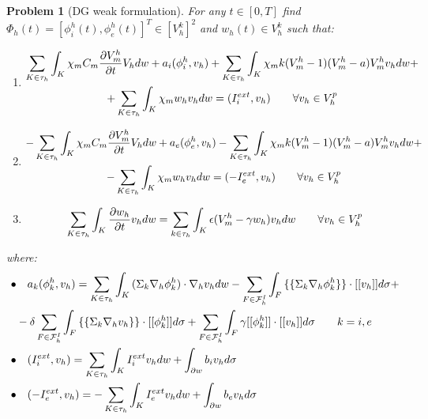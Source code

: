 \documentclass[a4paper,11pt]{article}
\newtheorem{problem}{Problem}
\begin{document}
    \begin{problem}[DG weak formulation]
    For any $t\in[0,T]$ find $\Phi_h(t)=[\phi_i^h(t),\phi_e^h(t)]^T \in [V_h^k]^2$  and  $w_h(t) \in V_h^k$ such that: \\
    \begin{enumerate}
    \item 
    \begin{equation*}
    \begin{gathered}
    \sum_{K \in \tau_h} \int_K{ \chi_m C_m \pdv{V_m^h}{t} V_h dw}+a_i(\phi_i^h,v_h)+\sum_{K \in \tau_h} \int_K{ \chi_m k (V_m^h-1)(V_m^h-a) V_m^h v_h dw}+\\
    +\sum_{K \in \tau_h} \int_K{ \chi_m w_h v_h dw}=(I_i^{ext},v_h) \qquad \forall v_h \in V_h^p\\
    \end{gathered}
    \end{equation*}
    \item
    \begin{equation*}
    \begin{gathered}
    -\sum_{K \in \tau_h} \int_K{ \chi_m C_m \pdv{V_m^h}{t} V_h dw}+a_e(\phi_e^h,v_h)-\sum_{K \in \tau_h} \int_K{ \chi_m k (V_m^h-1)(V_m^h-a) V_m^h v_h dw}+\\
    -\sum_{K \in \tau_h} \int_K{ \chi_m w_h v_h dw}=(-I_e^{ext},v_h) \qquad \forall v_h \in V_h^p\\
    \end{gathered}
    \end{equation*}
    \item
    \begin{equation*}
    \sum_{K \in \tau_h} \int_K{\pdv{w_h}{t}v_h dw}=\sum_{k \in \tau_h} \int_K{\epsilon (V_m^h-\gamma w_h) v_h dw} \qquad \forall v_h \in V_h^p\\
    \end{equation*}
    \end{enumerate}
    \vspace{5mm}
    where:
    \vspace{3mm}
    \begin{equation*}
    \begin{aligned}
    \bullet& \quad a_k(\phi_k^h,v_h)=\sum_{K \in \tau_h} \int_K{(\Sigma_k \nabla_h \phi_k^h) \cdot \nabla_h v_h dw}-\sum_{F \in \mathcal{F}_h^I} \int_F { \{\{\Sigma_k \nabla_h \phi_k^h \}\} \cdot [[v_h]] d\sigma}+\\
    &-\delta \sum_{F \in \mathcal{F}_h^I} \int_F{ \{\{\Sigma_k \nabla_h v_h\}\} \cdot [[\phi_k^h]]d\sigma}+\sum_{F \in \mathcal{F}_h^I}\int_F {\gamma [[\phi_k^h]] \cdot [[v_h]] d\sigma} \qquad k=i,e\\
    \newline
    \bullet& \quad (I_i^{ext},v_h)=\sum_{K \in \tau_h} \int_K {I_i^{ext} v_h dw}+\int_{\partial w}{b_i v_h d\sigma}\\
    \newline
    \bullet& \quad (-I_e^{ext},v_h)=-\sum_{K \in \tau_h} \int_K {I_e^{ext} v_h dw}+\int_{\partial w}{b_e v_h d\sigma}
    \end{aligned}
    \end{equation*}
    

\end{problem}
\end{document}

